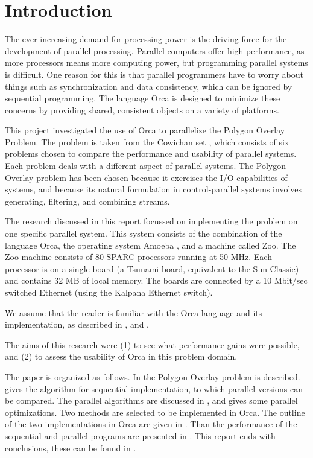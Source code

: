 \section{Introduction}

The ever-increasing demand for processing power is the
driving force for the development of parallel processing.
Parallel computers offer high performance,
as more processors means more computing power,
but programming parallel systems is difficult.
One reason for this is that parallel programmers have to 
worry about things such as synchronization and data consistency,
which can be ignored by sequential programming.
The language Orca is designed to minimize these concerns by
providing shared, consistent objects on a variety of
platforms.

This project investigated the use of Orca to parallelize
the Polygon Overlay Problem.
The problem is taken from the Cowichan set \cite{Wilson:1994},
which consists of six problems chosen to compare the performance
and usability of parallel systems.
Each problem deals with a different aspect of parallel systems.
The Polygon Overlay problem has been chosen because it 
exercises the I/O capabilities of systems, and because its 
natural formulation in control-parallel systems involves
generating, filtering, and combining streams.

The research discussed in this report focussed on implementing
the problem on one specific parallel system.
This system consists of the combination of the language Orca,
the operating system Amoeba \cite{Mullender:1990},
and a machine called Zoo.
The Zoo machine consists of 80 SPARC processors running at 50 MHz.
Each processor is on a single board (a Tsunami board, equivalent
to the Sun Classic) and contains 32 MB of local memory.
The boards are connected by a 10 Mbit/sec switched Ethernet
(using the Kalpana Ethernet switch).

We assume that the reader is familiar with the Orca language and its
implementation, as described in
\cite{bal:1992}, \cite{bal:1991:a} and \cite{Bhoedjang:1993}.

The aims of this research were (1) to see what performance gains
were possible, and (2) to assess the usability of Orca in this problem
domain.


The paper is organized as follows.
In
 the Polygon Overlay problem is
described.
 gives the algorithm for sequential
implementation, to which parallel versions can be compared.
The parallel algorithms are discussed in 
, and
 gives some parallel optimizations.
Two methods are selected to be implemented in Orca.
The outline of the two implementations in Orca are given in
.
Than the performance of the sequential and parallel programs are
presented in
.
This report ends with conclusions, these can be found in
.

